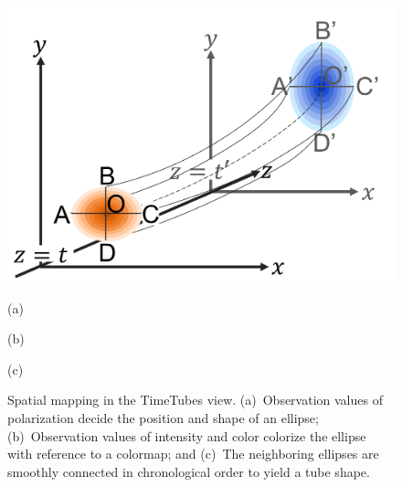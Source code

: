 \begin{figure}[tb]
\begin{minipage}{0.26\linewidth}
    \end{minipage}
    \begin{minipage}{0.36\linewidth}
        \centering
        \includegraphics[width=.99\linewidth]{vgtc_journal_latex/figures/howtotube.pdf}
    \end{minipage}
    \begin{minipage}{0.34\linewidth}
        \centering
        \footnotesize{\sf (a)}
        \end{minipage}
    \begin{minipage}{0.26\linewidth}
        \centering
        \footnotesize{\sf (b)}
    \end{minipage}
    \begin{minipage}{0.36\linewidth}
        \centering
        \footnotesize{\sf (c)}
    \end{minipage}
    \caption{Spatial mapping in the TimeTubes view. 
    (a)~Observation values of polarization decide the position and shape of an ellipse;
    (b)~Observation values of intensity and color colorize the ellipse with reference to a colormap; and
    (c)~The neighboring ellipses are smoothly connected in chronological order to yield a tube shape.}
    \label{fig:howtoplot}
\end{figure}
